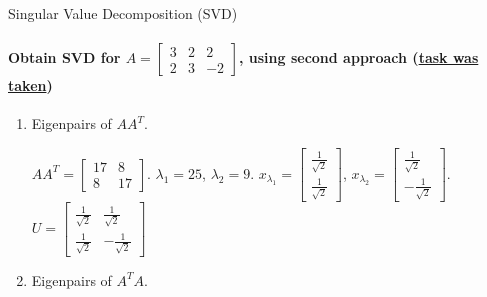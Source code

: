 \documentclass[aspectratio=169]{beamer}
\begin{document}
\begin{frame}[t]{Singular Value Decomposition (SVD)}
\framesubtitle{Obtain SVD for $A= \begin{bmatrix}
    3 & 2 & 2 \\
    2 & 3 & -2 
    \end{bmatrix}$, using second approach (\href{https://jonathan-hui.medium.com/machine-learning-singular-value-decomposition-svd-principal-component-analysis-pca-1d45e885e491}{task was taken})}
\vspace{-0.8cm}
    \begin{enumerate}
        \item Eigenpairs of $AA^T$.

        $AA^T=\begin{bmatrix}
        17 & 8\\ 
        8 & 17 
        \end{bmatrix}$. $\lambda_1 = 25$, $\lambda_2 = 9$. $x_{\lambda_1} = \begin{bmatrix}
        \frac{1}{\sqrt{2}}\\
        \frac{1}{\sqrt{2}}
        \end{bmatrix}$, $x_{\lambda_2} = \begin{bmatrix}
            \frac{1}{\sqrt{2}}\\
            -\frac{1}{\sqrt{2}}
            \end{bmatrix}$. $U = \begin{bmatrix}
                \frac{1}{\sqrt{2}} & \frac{1}{\sqrt{2}}\\ 
                \frac{1}{\sqrt{2}} &  -\frac{1}{\sqrt{2}}
            \end{bmatrix}$
        \item Eigenpairs of $A^TA$.
        

\end{enumerate}
\end{frame}
\end{document}
